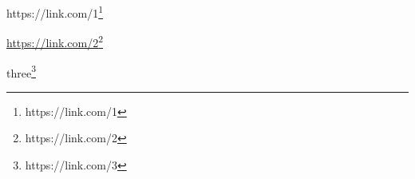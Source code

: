 
https://link.com/1\footnote{https://link.com/1}

\url{https://link.com/2}\footnote{https://link.com/2}

three\footnote{https://link.com/3}


